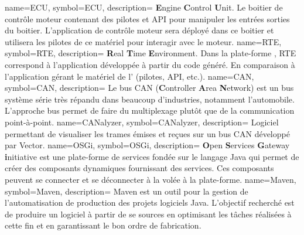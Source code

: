   {
	name=ECU,
	symbol=ECU,
	description=
	{
	  {\bf E}ngine {\bf C}ontrol {\bf U}nit. Le boitier de contrôle moteur contenant des
	  pilotes et API pour manipuler les entrées sorties du boitier. L'application de contrôle
	  moteur sera déployé dans ce boitier et utilisera les pilotes de ce matériel pour interagir avec le moteur.
	}
}
  {
	name=RTE,
	symbol=RTE,
	description=
	{
	  {\bf R}eal {\bf T}ime {\bf E}nvironment. Dans la plate-forme , RTE
	  correspond à l'application développée à partir du code généré. En comparaison à
	  l'application gérant le matériel de l' (pilotes, API, etc.).
	}
}
  {
	name=CAN,
	symbol=CAN,
	description=
	{
	  Le bus CAN ({\bf C}ontroller {\bf A}rea {\bf N}etwork) est un bus système série
	  très répandu dans beaucoup d'industries, notamment l'automobile. L'approche
	  bus permet de faire du multiplexage plutôt que de la communication point-à-point.
	}
}
  {
	name=CANalyzer,
	symbol=CANalyzer,
	description=
	{
	  Logiciel permettant de visualiser les trames émises et reçues sur un bus CAN développé par Vector. 
	}
}
  {
	name=OSGi,
	symbol=OSGi,
	description=
	{
	  {\bf O}pen {\bf S}ervices {\bf G}ateway {\bf i}nitiative est une plate-forme de services
	  fondée sur le langage Java qui permet de créer des composants dynamiques fournissant
	  des services. Ces composants peuvent se connecter et se déconnecter \og à la volée
	  \fg{} à la plate-forme.
	}
}
  {
	name=Maven,
	symbol=Maven,
	description=
	{
	  Maven est un outil pour la gestion de l'automatisation de production des projets logiciels
	  Java. L'objectif recherché est de produire un logiciel à partir de se sources en optimisant
	  les tâches réalisées à cette fin et en garantissant le bon ordre de fabrication.
	}
}
